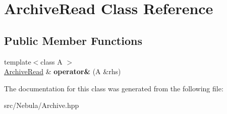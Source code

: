 \hypertarget{classArchiveRead}{\section{\-Archive\-Read \-Class \-Reference}
\label{classArchiveRead}
}
\subsection*{\-Public \-Member \-Functions}
\begin{DoxyCompactItemize}
\item 
\hypertarget{classArchiveRead_a776e35b241a26430d288a674454f032a}{{\footnotesize template$<$class A $>$ }\\\hyperlink{classArchiveRead}{\-Archive\-Read} \& {\bfseries operator\&} (\-A \&rhs)}\label{classArchiveRead_a776e35b241a26430d288a674454f032a}

\end{DoxyCompactItemize}


\-The documentation for this class was generated from the following file\-:\begin{DoxyCompactItemize}
\item 
src/\-Nebula/\-Archive.\-hpp\end{DoxyCompactItemize}
